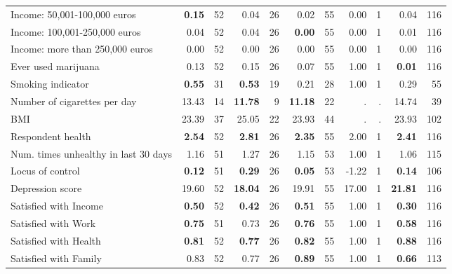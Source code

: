 \begin{tabular}{l r r r r r r r r r r}
Income: 50,001-100,000 euros & \textbf{     0.15} &        52 &      0.04 &        26 &      0.02 &        55 &      0.00 &         1 &      0.04 &       116 \\
Income: 100,001-250,000 euros &      0.04 &        52 &      0.04 &        26 & \textbf{     0.00} &        55 &      0.00 &         1 &      0.01 &       116 \\
Income: more than 250,000 euros &      0.00 &        52 &      0.00 &        26 &      0.00 &        55 &      0.00 &         1 &      0.00 &       116 \\
Ever used marijuana &      0.13 &        52 &      0.15 &        26 &      0.07 &        55 &      1.00 &         1 & \textbf{     0.01} &       116 \\
Smoking indicator & \textbf{     0.55} &        31 & \textbf{     0.53} &        19 &      0.21 &        28 &      1.00 &         1 &      0.29 &        55 \\
Number of cigarettes per day &     13.43 &        14 & \textbf{    11.78} &         9 & \textbf{    11.18} &        22 &         . & . &     14.74 &        39 \\
BMI &     23.39 &        37 &     25.05 &        22 &     23.93 &        44 &         . & . &     23.93 &       102 \\
Respondent health & \textbf{     2.54} &        52 & \textbf{     2.81} &        26 & \textbf{     2.35} &        55 &      2.00 &         1 & \textbf{     2.41} &       116 \\
Num. times unhealthy in last 30 days &      1.16 &        51 &      1.27 &        26 &      1.15 &        53 &      1.00 &         1 &      1.06 &       115 \\
Locus of control & \textbf{     0.12} &        51 & \textbf{     0.29} &        26 & \textbf{     0.05} &        53 &     -1.22 &         1 & \textbf{     0.14} &       106 \\
Depression score &     19.60 &        52 & \textbf{    18.04} &        26 &     19.91 &        55 &     17.00 &         1 & \textbf{    21.81} &       116 \\
Satisfied with Income & \textbf{     0.50} &        52 & \textbf{     0.42} &        26 & \textbf{     0.51} &        55 &      1.00 &         1 & \textbf{     0.30} &       116 \\
Satisfied with Work & \textbf{     0.75} &        51 &      0.73 &        26 & \textbf{     0.76} &        55 &      1.00 &         1 & \textbf{     0.58} &       116 \\
Satisfied with Health & \textbf{     0.81} &        52 & \textbf{     0.77} &        26 & \textbf{     0.82} &        55 &      1.00 &         1 & \textbf{     0.88} &       116 \\
Satisfied with Family &      0.83 &        52 &      0.77 &        26 & \textbf{     0.89} &        55 &      1.00 &         1 & \textbf{     0.66} &       113 \\
\bottomrule
\end{tabular}
